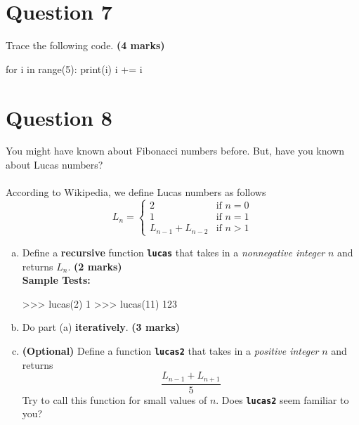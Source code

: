 \section{Question 7}
Trace the following code. \textbf{(4 marks)}
\begin{python}
for i in range(5):
    print(i)
    i += i
\end{python}

\section{Question 8}
You might have known about Fibonacci numbers before. But, have you known about Lucas numbers? \\ \\
According to Wikipedia, we define Lucas numbers as follows
\[
    L_n =
    \begin{cases}
        2 & \text{if } n = 0 \\
        1 & \text{if } n = 1 \\
        L_{n-1} + L_{n-2} & \text{if } n > 1
    \end{cases}
\]
\begin{enumerate}[(a)]
\item Define a \textbf{recursive} function \texttt{\bfseries lucas} that takes in a \textit{nonnegative integer} $n$ and
returns $L_n$. \textbf{(2 marks)} \\
\textbf{Sample Tests:}
\begin{python}
>>> lucas(2)
1
>>> lucas(11)
123
\end{python}

\item Do part (a) \textbf{iteratively}. \textbf{(3 marks)}

\item \textbf{(Optional)} Define a function \texttt{\bfseries lucas2} that takes in a \textit{positive integer} $n$ and returns
\[\frac{L_{n-1}+L_{n+1}}{5}\]
Try to call this function for small values of $n$. Does \texttt{\bfseries lucas2} seem familiar to you?
\end{enumerate}

